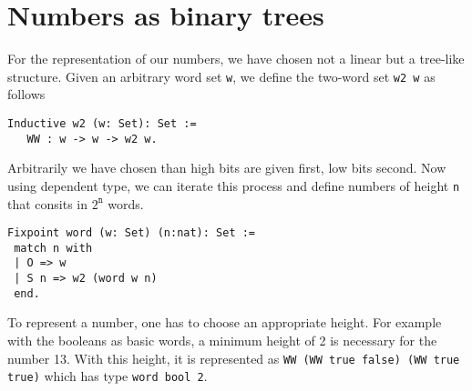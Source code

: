 \section{Numbers as binary trees \label{Tree}}
For the representation of our numbers, we have chosen not a linear but a 
tree-like structure. Given an arbitrary word set {\tt w}, we define
the two-word set {\tt w2 w} as follows 
\begin{verbatim}
Inductive w2 (w: Set): Set :=  
   WW : w -> w -> w2 w.
\end{verbatim}
Arbitrarily we have chosen than high bits are given first, low bits
second. Now using dependent type, we can iterate this process and define
numbers of height {\tt n} that consits in $2^\texttt{n}$ words.
\begin{verbatim}
Fixpoint word (w: Set) (n:nat): Set :=
 match n with
 | O => w
 | S n => w2 (word w n)
 end.
\end{verbatim}
To represent a number, one has to choose an appropriate height.
For example with the booleans as basic words, a minimum
height of 2 is necessary for the number 13. With this height, it is represented 
as  {\tt WW (WW true false) (WW true true)} which has type {\tt word bool 2}.

